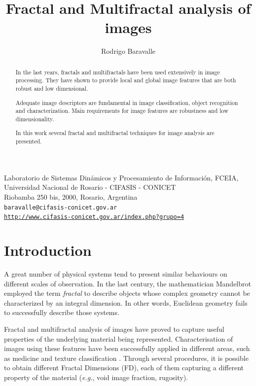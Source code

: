 \documentclass[oneside,a4paper,english,links]{article}
\title{Fractal and Multifractal analysis of images}
\author{Rodrigo Baravalle}
\begin{document}
\maketitle
\begin{center}
\small{Laboratorio de Sistemas Din\'amicos y Procesamiento de Informaci\'on, FCEIA, Universidad Nacional de Rosario - CIFASIS - CONICET}\\
\small{Riobamba 250 bis, 2000, Rosario, Argentina}\\

\texttt{baravalle@cifasis-conicet.gov.ar}\\
\texttt{\url{http://www.cifasis-conicet.gov.ar/index.php?grupo=4}}
\end{center}

\begin{abstract}
In the last years, fractals and multifractals have been used extensively in image processing. They have shown to provide local and global image features that are both robust and low dimensional.

Adequate image descriptors are fundamental in image classification, object recognition and characterization. Main requirements for image features are robustness and low dimensionality.

In this work several fractal and multifractal techniques for image analysis are presented.
\end{abstract}

\section{Introduction}
A great number of physical systems tend to present similar behaviours on different scales of observation. In the last century, the mathematician Mandelbrot employed the term {\em fractal} to describe objects whose complex geometry cannot be characterized by an integral dimension. In other words, Euclidean geometry fails to successfully describe those systems.

Fractal and multifractal analysis of images have proved to capture useful properties of the underlying material being represented. Characterisation of images using these features have been successfully applied in different areas, such as medicine \cite{Andjelkovic2008,Yu2011} and texture classification \cite{Wendt2009}. Through several procedures, it is possible to obtain different Fractal Dimensions (FD), each of them capturing a different property of the material ({\em e.g.}, void image fraction, rugosity).
\end{document}
